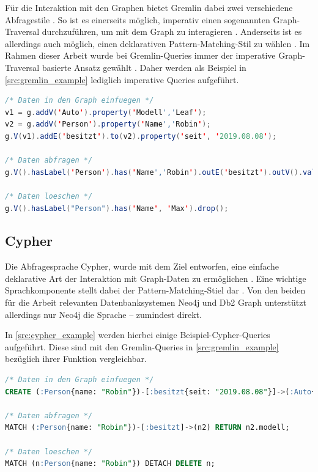 Für die Interaktion mit den Graphen bietet Gremlin dabei zwei verschiedene Abfragestile \cite{gremlin_paper}. So ist es einerseits möglich, imperativ einen sogenannten Graph-Traversal durchzuführen, um mit dem Graph zu interagieren \cite{gremlin_paper}. Anderseits ist es allerdings auch möglich, einen deklarativen Pattern-Matching-Stil zu wählen \cite{gremlin_paper}. Im Rahmen dieser Arbeit wurde bei Gremlin-Queries immer der imperative Graph-Traversal basierte Ansatz gewählt \cite{gremlin_paper}. Daher werden als Beispiel in \autoref{src:gremlin_example} lediglich imperative Queries aufgeführt. 

\begin{lstlisting}[caption={Beispiel Gremlin-Queries},language=JAVA,label=src:gremlin_example]
/* Daten in den Graph einfuegen */
v1 = g.addV('Auto').property('Modell','Leaf');
v2 = g.addV('Person').property('Name','Robin');
g.V(v1).addE('besitzt').to(v2).property('seit', '2019.08.08');

/* Daten abfragen */
g.V().hasLabel('Person').has('Name','Robin').outE('besitzt').outV().values('Modell')

/* Daten loeschen */
g.V().hasLabel("Person").has('Name', 'Max').drop();
\end{lstlisting}

\subsection{Cypher}
Die Abfragesprache Cypher, wurde mit dem Ziel entworfen, eine einfache deklarative Art der Interaktion mit Graph-Daten zu ermöglichen \cite{gdbms}. Eine wichtige Sprachkomponente stellt dabei der Pattern-Matching-Stiel dar \cite{gdbms}. Von den beiden für die Arbeit relevanten Datenbanksystemen Neo4j und Db2 Graph unterstützt allerdings nur Neo4j die Sprache -- zumindest direkt. 

In \autoref{src:cypher_example} werden hierbei einige Beispiel-Cypher-Queries aufgeführt. Diese sind mit den Gremlin-Queries in \autoref{src:gremlin_example} bezüglich ihrer Funktion vergleichbar. 

\begin{lstlisting}[caption={Beispiel Cypher-Queries},language=SQL,label=src:cypher_example]
/* Daten in den Graph einfuegen */
CREATE (:Person{name: "Robin"})-[:besitzt{seit: "2019.08.08"}]->(:Auto{modell: "Leaf"});

/* Daten abfragen */
MATCH (:Person{name: "Robin"})-[:besitzt]->(n2) RETURN n2.modell;

/* Daten loeschen */
MATCH (n:Person{name: "Robin"}) DETACH DELETE n;
\end{lstlisting}

